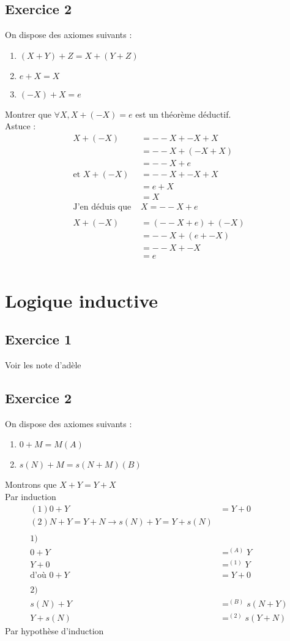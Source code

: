 \documentclass[11pt,a4paper]{article}
\begin{document}
	\subsection{Exercice 2}
	On dispose des axiomes suivants :
	\begin{enumerate}
		\item $(X + Y) + Z = X + (Y + Z)$
		\item $e + X = X$
		\item $(-X) + X = e$
	\end{enumerate}
	Montrer que $\forall X, X + (-X) = e$ est un théorème déductif.\\
	Astuce :\\
	\begin{align*}
		X + (-X) &= --X + -X +X\\
		&= --X + (-X + X)\\
		&= --X + e\\
		\text{et } X + (-X) &= --X + -X +X\\
		&= e + X\\
		&= X\\
		\text{J'en déduis que } &X = --X + e\\ \\
		X + (-X) &= (--X + e) + (-X)\\
		&= --X + (e + -X)\\
		&= --X + -X\\
		&= e\\
	\end{align*}
	\newpage
	\section{Logique inductive}
	\subsection{Exercice 1}
	Voir les note d'adèle
	
	\subsection{Exercice 2}
	On dispose des axiomes suivants :
	\begin{enumerate}
		\item $0 + M = M (A)$
		\item $s(N) + M = s(N + M) (B)$
	\end{enumerate}
	Montrons que $X + Y = Y + X$\\
	Par induction
	\begin{align*}
		(1) 0 + Y &= Y + 0\\
		(2) N + Y = Y + N \rightarrow s(N) + Y = Y + s(N)\\ \\
		1)&\\
		0 + Y &=^{(A)} Y\\
		Y + 0 &=^{(1)} Y\\
		\text{d'où } 0 + Y &= Y + 0\\ \\
		2)&\\
		s(N) + Y &=^{(B)} s(N +Y)\\
		Y + s(N) &=^{(2)} s(Y + N)		 
	\end{align*}
	Par hypothèse d'induction
\end{document}
